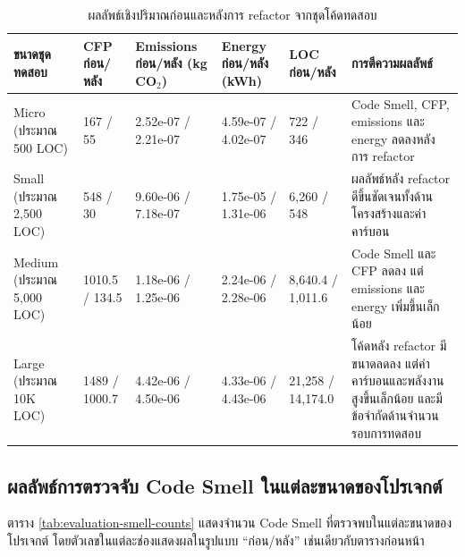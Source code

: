 \begin{table}[H]
    \centering
    \scriptsize
    \renewcommand{\arraystretch}{1.15}
    \setlength{\tabcolsep}{3pt}
    \begin{tabularx}{\textwidth}{|P{2.1cm}|P{2.2cm}|P{2.5cm}|P{2.5cm}|P{2.5cm}|X|}
        \hline
        {\boldfont ขนาดชุดทดสอบ} & {\boldfont CFP ก่อน/หลัง} & {\boldfont Emissions ก่อน/หลัง (kg CO$_2$)} & {\boldfont Energy ก่อน/หลัง (kWh)} & {\boldfont LOC ก่อน/หลัง} & {\boldfont การตีความผลลัพธ์} \\
        \hline
        Micro (ประมาณ 500 LOC) & 167 / 55 & 2.52e-07 / 2.21e-07 & 4.59e-07 / 4.02e-07 & 722 / 346 & Code Smell, CFP, emissions และ energy ลดลงหลังการ refactor \\
        \hline
        Small (ประมาณ 2{,}500 LOC) & 548 / 30 & 9.60e-06 / 7.18e-07 & 1.75e-05 / 1.31e-06 & 6{,}260 / 548 & ผลลัพธ์หลัง refactor ดีขึ้นชัดเจนทั้งด้านโครงสร้างและค่าคาร์บอน \\
        \hline
        Medium (ประมาณ 5{,}000 LOC) & 1010.5 / 134.5 & 1.18e-06 / 1.25e-06 & 2.24e-06 / 2.28e-06 & 8{,}640.4 / 1{,}011.6 & Code Smell และ CFP ลดลง แต่ emissions และ energy เพิ่มขึ้นเล็กน้อย \\
        \hline
        Large (ประมาณ 10K LOC) & 1489 / 1000.7 & 4.42e-06 / 4.50e-06 & 4.33e-06 / 4.43e-06 & 21{,}258 / 14{,}174.0 & โค้ดหลัง refactor มีขนาดลดลง แต่ค่าคาร์บอนและพลังงานสูงขึ้นเล็กน้อย และมีข้อจำกัดด้านจำนวนรอบการทดสอบ \\
        \hline
    \end{tabularx}
\captionsetup{justification=centering, name=ตาราง}
\caption{ผลลัพธ์เชิงปริมาณก่อนและหลังการ refactor จากชุดโค้ดทดสอบ}
\label{tab:evaluation-result-metrics}
\end{table}

\subsection{ผลลัพธ์การตรวจจับ Code Smell ในแต่ละขนาดของโปรเจกต์}

ตาราง \ref{tab:evaluation-smell-counts} แสดงจำนวน Code Smell ที่ตรวจพบในแต่ละขนาดของโปรเจกต์ โดยตัวเลขในแต่ละช่องแสดงผลในรูปแบบ ``ก่อน/หลัง'' เช่นเดียวกับตารางก่อนหน้า

